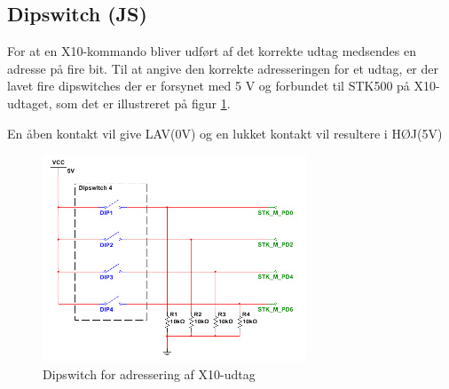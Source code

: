\newpage
\subsection{Dipswitch (JS)}
For at en X10-kommando bliver udført af det korrekte udtag medsendes en adresse på fire bit.
Til at angive den korrekte adresseringen for et udtag, er der lavet fire dipswitches der er forsynet med 5 V og forbundet til STK500 på X10-udtaget, som det er illustreret på figur \ref{fig:DIPSWITCH}.

En åben kontakt vil give LAV(0V) og en lukket kontakt vil resultere i HØJ(5V)

\begin{figure}[htbp]
	\centering
	\includegraphics[width=0.70\textwidth]{billeder/HWdesign/DIPSWITCH}
	\caption{Dipswitch for adressering af X10-udtag}
	\label{fig:DIPSWITCH}
\end{figure}

